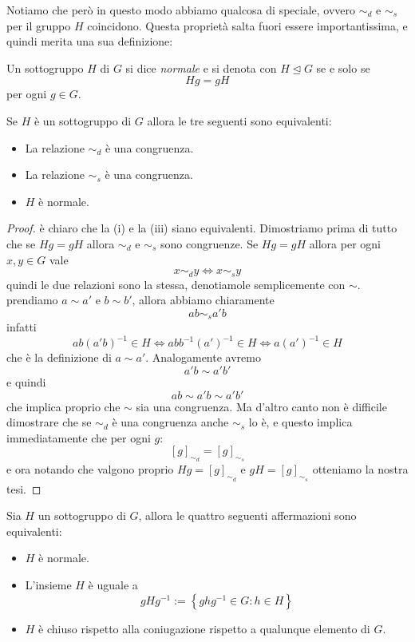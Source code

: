 \documentclass[11pt]{scrartcl}
\newcommand{\normal}{\mathrel{\unlhd}}
\begin{document}
	Notiamo che però in questo modo abbiamo qualcosa di speciale, ovvero $\sim_d$ e $\sim_s$ per il gruppo $H$ coincidono. Questa proprietà salta fuori essere importantissima, e quindi merita una sua definizione:
	\begin{definition}
		Un sottogruppo $H$ di $G$ si dice \textit{normale} e si denota con $H\normal G$ se e solo se
		$$Hg=gH$$
		per ogni $g\in G$.
	\end{definition}
	\begin{lemma}
		Se $H$ è un sottogruppo di $G$ allora le tre seguenti sono equivalenti:
		\begin{itemize}
			\item[(i)] La relazione $\sim_d$ è una congruenza.
			\item[(ii)] La relazione $\sim_s$ è una congruenza.
			\item[(iii)] $H$ è normale.
		\end{itemize}
	\end{lemma}
	\begin{proof}
		è chiaro che la (i) e la (iii) siano equivalenti. Dimostriamo prima di tutto che se $Hg=gH$ allora $\sim_d$ e $\sim_s$ sono congruenze. Se $Hg=gH$ allora per ogni $x,y\in G$ vale
		$$x\sim_d y \iff x\sim_s y$$
		quindi le due relazioni sono la stessa, denotiamole semplicemente con $\sim$. prendiamo $a\sim a'$ e $b\sim b'$, allora abbiamo chiaramente
		$$ab\sim_s a'b$$
		infatti 
		$$ab(a'b)^{-1}\in H \iff abb^{-1}(a')^{-1}\in H \iff a(a')^{-1}\in H$$
		che è la definizione di $a\sim a'$. Analogamente avremo
		$$a'b\sim a'b'$$
		e quindi
		$$ab\sim a'b\sim a'b'$$
		che implica proprio che $\sim$ sia una congruenza. Ma d'altro canto non è difficile dimostrare che se $\sim_d$ è una congruenza anche $\sim_s$ lo è, e questo implica immediatamente che per ogni $g$:
		$$[g]_{\sim_d}=[g]_{\sim_s}$$
		e ora notando che valgono proprio $Hg=[g]_{\sim_d}$ e $gH=[g]_{\sim_s}$ otteniamo la nostra tesi.
	\end{proof}
	\begin{lemma}
		Sia $H$ un sottogruppo di $G$, allora le quattro seguenti affermazioni sono equivalenti:
		\begin{itemize}
			\item[(i)] $H$ è normale.
			\item[(ii)] L'insieme $H$ è uguale a
				$$gHg^{-1}:=\left\{ghg^{-1}\in G:h\in H\right\}$$
			\item[(iii)] $H$ è chiuso rispetto alla coniugazione rispetto a qualunque elemento di $G$.
		\end{itemize}
	\end{lemma}
\end{document}
